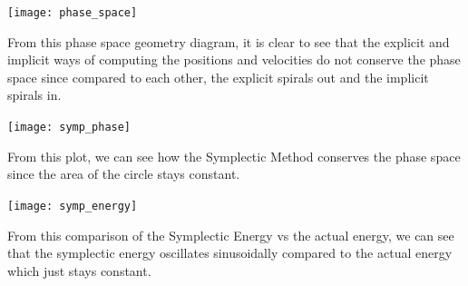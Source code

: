 \documentclass[10pt]{report}
\begin{document}
\texttt{[image: phase\_space]}

From this phase space geometry diagram, it is clear to see that the explicit and implicit ways of computing the positions and velocities do not conserve the phase space since compared to each other, the explicit spirals out and the implicit spirals in.

\texttt{[image: symp\_phase]}

From this plot, we can see how the Symplectic Method conserves the phase space since the area of the circle stays constant.

\texttt{[image: symp\_energy]}

From this comparison of the Symplectic Energy vs the actual energy, we can see that the symplectic energy oscillates sinusoidally compared to the actual energy which just stays constant. 
 
\end{document}
